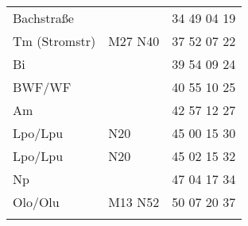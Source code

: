 \begin{tabular}{!{\color{schiefergrau}\vrule width 3pt}*{3}{l!{\color{schiefergrau}\vrule width 3pt}}}
Bachstraße   &                                                                   & 34 49 04 19 \\
Tm (Stromstr)& \mbus{} M27 \nbus{} N40                                           & 37 52 07 22 \\
Bi           &                                                                   & 39 54 09 24 \\
BWF/WF       &                                                                   & 40 55 10 25 \\
Am           &                                                                   & 42 57 12 27 \\
Lpo/Lpu      & \nusechs{} \nbus{} N20                                            & 45 00 15 30 \\
\hline
Lpo/Lpu      & \nusechs{} \nbus{} N20                                            & 45 02 15 32 \\
Np           &                                                                   & 47 04 17 34 \\
Olo/Olu      & \nuacht{} \mtram{} M13 \nbus{} N52                                & 50 07 20 37 \\
\myhline
\end{tabular}
